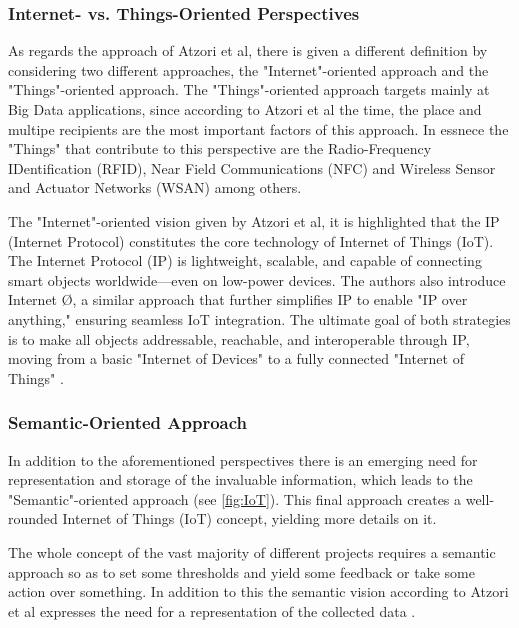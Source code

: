 {	\subsubsection{Internet- vs. Things-Oriented Perspectives \cite{Atzori2010}}
	{
		As regards the approach of Atzori et al, there is given a different definition by considering two different approaches, the "Internet"-oriented approach and the "Things"-oriented approach. The "Things"-oriented approach targets mainly at Big Data applications, since according to Atzori et al the time, the place and multipe recipients are the most important factors of this approach. In essnece the "Things" that contribute to this perspective are the Radio-Frequency IDentification (RFID), Near Field Communications (NFC) and Wireless Sensor and Actuator Networks (WSAN) among others.
		
		The "Internet"-oriented vision given by Atzori et al, it is highlighted that the IP (Internet Protocol) constitutes the core technology of Internet of Things (IoT). The Internet Protocol (IP) is lightweight, scalable, and capable of connecting smart objects worldwide—even on low-power devices. The authors also introduce Internet Ø, a similar approach that further simplifies IP to enable "IP over anything," ensuring seamless IoT integration. The ultimate goal of both strategies is to make all objects addressable, reachable, and interoperable through IP, moving from a basic "Internet of Devices" to a fully connected "Internet of Things" \cite{Atzori2010}. 
	}
	
	\subsubsection{Semantic-Oriented Approach}
	{
		In addition to the aforementioned perspectives there is an emerging need for representation and storage of the invaluable information, which leads to the "Semantic"-oriented approach (see \ref{fig:IoT}). This final approach creates a well-rounded Internet of Things (IoT) concept, yielding more details on it. 
		
		The whole concept of the vast majority of different projects requires a semantic approach so as to set some thresholds and yield some feedback or take some action over something. In addition to this the semantic vision according to Atzori et al expresses the need for a representation of the collected data \cite{Atzori2010}.
		
}}
